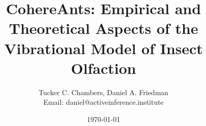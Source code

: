 \thispagestyle{empty}
\title{CohereAnts: Empirical and Theoretical Aspects of the Vibrational Model of Insect Olfaction}
\author{Tucker C. Chambers, Daniel A. Friedman\\ Email: daniel@activeinference.institute}
\date{\today}
\maketitle
\clearpage
